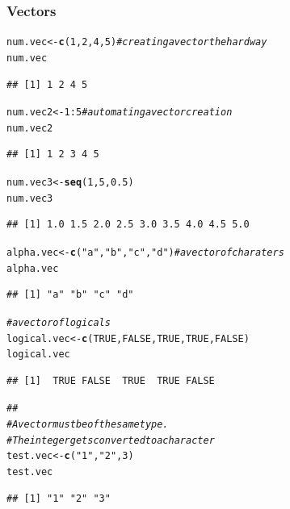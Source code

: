 \documentclass{article}\usepackage[]{graphicx}\usepackage[]{color}
\makeatletter
\newcommand{\hlnum}[1]{\textcolor[rgb]{0.686,0.059,0.569}{#1}}%
\newcommand{\hlstr}[1]{\textcolor[rgb]{0.192,0.494,0.8}{#1}}%
\newcommand{\hlcom}[1]{\textcolor[rgb]{0.678,0.584,0.686}{\textit{#1}}}%
\newcommand{\hlopt}[1]{\textcolor[rgb]{0,0,0}{#1}}%
\newcommand{\hlstd}[1]{\textcolor[rgb]{0.345,0.345,0.345}{#1}}%
\newcommand{\hlkwb}[1]{\textcolor[rgb]{0.69,0.353,0.396}{#1}}%
\newcommand{\hlkwd}[1]{\textcolor[rgb]{0.737,0.353,0.396}{\textbf{#1}}}%
\newenvironment{kframe}{%
 \def\at@end@of@kframe{}%
 \ifinner\ifhmode%
  \def\at@end@of@kframe{\end{minipage}}%
  \begin{minipage}{\columnwidth}%
 \fi\fi%
 \def\FrameCommand##1{\hskip\@totalleftmargin \hskip-\fboxsep
 \colorbox{shadecolor}{##1}\hskip-\fboxsep
     \hskip-\linewidth \hskip-\@totalleftmargin \hskip\columnwidth}%
 \MakeFramed {\advance\hsize-\width
   \@totalleftmargin\z@ \linewidth\hsize
   \@setminipage}}%
 {\par\unskip\endMakeFramed%
 \at@end@of@kframe}
\newenvironment{knitrout}{}{} %
\makeatother
\begin{document}
    \subsubsection*{Vectors}
\begin{knitrout}
\color{fgcolor}\begin{kframe}
\begin{alltt}
  \hlstd{num.vec} \hlkwb{<-} \hlkwd{c}\hlstd{(}\hlnum{1}\hlstd{,} \hlnum{2}\hlstd{,} \hlnum{4}\hlstd{,} \hlnum{5}\hlstd{)}  \hlcom{# creating a vector the hard way}
  \hlstd{num.vec}
\end{alltt}
\begin{verbatim}
## [1] 1 2 4 5
\end{verbatim}
\begin{alltt}
  \hlstd{num.vec2} \hlkwb{<-} \hlnum{1}\hlopt{:}\hlnum{5} \hlcom{# automating a vector creation}
  \hlstd{num.vec2}
\end{alltt}
\begin{verbatim}
## [1] 1 2 3 4 5
\end{verbatim}
\begin{alltt}
  \hlstd{num.vec3} \hlkwb{<-} \hlkwd{seq}\hlstd{(}\hlnum{1}\hlstd{,} \hlnum{5}\hlstd{,} \hlnum{0.5}\hlstd{)}
  \hlstd{num.vec3}
\end{alltt}
\begin{verbatim}
## [1] 1.0 1.5 2.0 2.5 3.0 3.5 4.0 4.5 5.0
\end{verbatim}
\begin{alltt}
  \hlstd{alpha.vec} \hlkwb{<-} \hlkwd{c}\hlstd{(}\hlstr{"a"}\hlstd{,} \hlstr{"b"}\hlstd{,} \hlstr{"c"}\hlstd{,} \hlstr{"d"}\hlstd{)}  \hlcom{# a vector of charaters}
  \hlstd{alpha.vec}
\end{alltt}
\begin{verbatim}
## [1] "a" "b" "c" "d"
\end{verbatim}
\begin{alltt}
  \hlcom{# a vector of logicals}
  \hlstd{logical.vec} \hlkwb{<-} \hlkwd{c}\hlstd{(}\hlnum{TRUE}\hlstd{,} \hlnum{FALSE}\hlstd{,} \hlnum{TRUE}\hlstd{,} \hlnum{TRUE}\hlstd{,} \hlnum{FALSE}\hlstd{)}
  \hlstd{logical.vec}
\end{alltt}
\begin{verbatim}
## [1]  TRUE FALSE  TRUE  TRUE FALSE
\end{verbatim}
\begin{alltt}
  \hlcom{##}
  \hlcom{# A vector must be of the same type. }
   \hlcom{# The integer gets converted to a character}
  \hlstd{test.vec} \hlkwb{<-} \hlkwd{c}\hlstd{(}\hlstr{"1"}\hlstd{,} \hlstr{"2"}\hlstd{,} \hlnum{3}\hlstd{)}
  \hlstd{test.vec}
\end{alltt}
\begin{verbatim}
## [1] "1" "2" "3"
\end{verbatim}
\end{kframe}
\end{knitrout}
    
\end{document}
